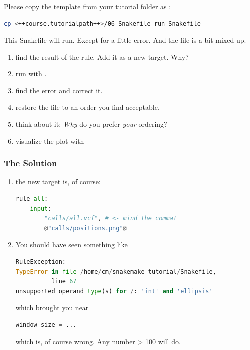 \begin{frame}[fragile]
	\frametitle{}
	Please copy the  template from your tutorial folder as :
	\begin{lstlisting}[language=Bash, style=Shell]
cp <++course.tutorialpath++>/06_Snakefile_run Snakefile
    \end{lstlisting}
    \pause
    \begin{task}
    	This Snakefile will run. Except for a little error. And the file is a bit mixed up.
    	\begin{enumerate}
    		\item find the result of the  rule. Add it as a new target. Why?
    		\item run with .
    		\item find the error and correct it.
    		\item restore the file to an order you find acceptable.
    		\item think about it: \emph{Why} do you prefer \emph{your} ordering?
    		\item visualize the plot with 
    	\end{enumerate}
    \end{task}
\end{frame}

\begin{frame}[fragile]
	\frametitle{The Solution}
	\begin{enumerate}[<+->]
		\item the new target is, of course:
		\begin{lstlisting}[language=Python,style=Python]
rule all:
    input:
        "calls/all.vcf", # <- mind the comma!
        @"calls/positions.png"@
	    \end{lstlisting}
        \item You should have seen something like
        \begin{lstlisting}[language=Python,style=Python, basicstyle=\footnotesize]
RuleException:
TypeError in file /home/cm/snakemake-tutorial/Snakefile, 
          line 67
unsupported operand type(s) for /: 'int' and 'ellipsis'
        \end{lstlisting}
        which brought you near
        \begin{lstlisting}[language=Python,style=Python]
    window_size = ...
        \end{lstlisting}
        which is, of course wrong. Any number > 100 will do.
    \end{enumerate}
\end{frame}

